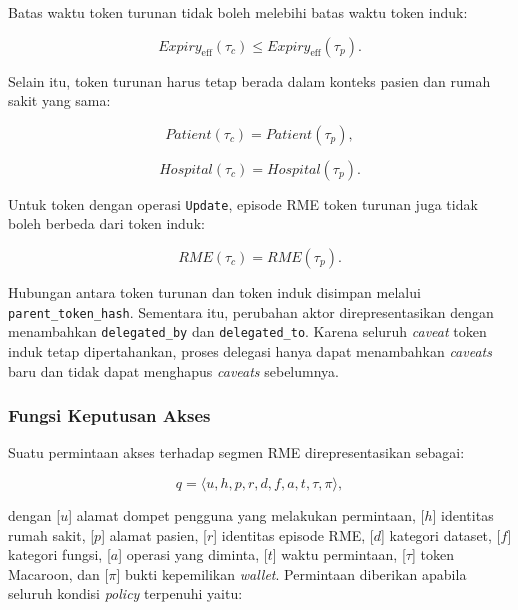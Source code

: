 \documentclass[bahasa, 12pt, a4paper, onecolumn, oneside, final]{report}
\begin{document}
Batas waktu token turunan tidak boleh melebihi batas waktu token induk:

\begin{equation}
	Expiry_{\operatorname{eff}}(\tau_c)
	\leq
	Expiry_{\operatorname{eff}}(\tau_p).
\end{equation}

Selain itu, token turunan harus tetap berada dalam konteks pasien dan rumah sakit yang sama:

\begin{equation}
	Patient(\tau_c)=Patient(\tau_p),
\end{equation}

\begin{equation}
	Hospital(\tau_c)=Hospital(\tau_p).
\end{equation}

Untuk token dengan operasi \texttt{Update}, episode RME token turunan juga tidak boleh berbeda dari token induk:

\begin{equation}
	RME(\tau_c)=RME(\tau_p).
\end{equation}

Hubungan antara token turunan dan token induk disimpan melalui \texttt{parent\_token\_hash}. Sementara itu, perubahan aktor direpresentasikan dengan menambahkan \texttt{delegated\_by} dan \texttt{delegated\_to}. Karena seluruh \textit{caveat} token induk tetap dipertahankan, proses delegasi hanya dapat menambahkan \textit{caveats} baru dan tidak dapat menghapus \textit{caveats} sebelumnya.

\subsubsection{Fungsi Keputusan Akses}

Suatu permintaan akses terhadap segmen RME direpresentasikan sebagai:

\begin{equation}
	q =
	\langle
	u,h,p,r,d,f,a,t,\tau,\pi
	\rangle,
	\label{eq:permintaan-akses}
\end{equation}

dengan [$u$] alamat dompet pengguna yang melakukan permintaan, [$h$] identitas rumah sakit, [$p$] alamat pasien, [$r$] identitas episode RME, [$d$] kategori dataset, [$f$] kategori fungsi, [$a$] operasi yang diminta, [$t$] waktu permintaan, [$\tau$] token Macaroon, dan [$\pi$] bukti kepemilikan \textit{wallet}. Permintaan diberikan apabila seluruh kondisi \textit{policy} terpenuhi yaitu:
\end{document}
